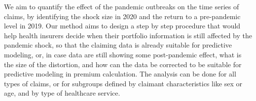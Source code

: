 \documentclass[]{risa}
\begin{document}
We aim to quantify the effect of the pandemic outbreaks on the time series of claims, by identifying the shock size in 2020 and the return to a pre-pandemic level in 2019. Our method aims to design a step by step procedure that would help health insurers decide when their portfolio information is still affected by the pandemic shock, so that the claiming data is already suitable for predictive modeling, or, in case data are still showing some post-pandemic effect, what is the size of the distortion, and how can the data be corrected to be suitable for predictive modeling in premium calculation. The analysis can be done for all types of claims, or for subgroups defined by claimant characteristics like sex or age, and by type of healthcare service. 


\end{document}
